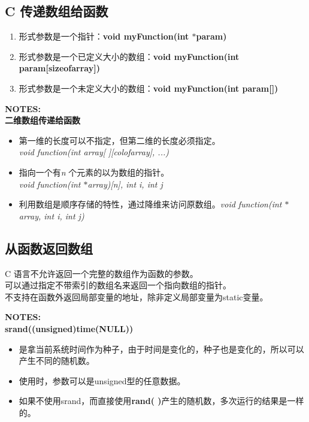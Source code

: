 \documentclass[UTF8]{ctexart}
\begin{document}
	\subsection{C 传递数组给函数}
		\begin{enumerate}
			\item 形式参数是一个指针：\textbf{void myFunction(int $*$param)}
			\item 形式参数是一个已定义大小的数组：\textbf{void myFunction(int param[sizeofarray])}
			\item 形式参数是一个未定义大小的数组：\textbf{void myFunction(int param[])}
		\end{enumerate}
		\begin{framed}
			\textbf{NOTES:}\\
			\textbf{二维数组传递给函数}
			\begin{itemize}
				\item 第一维的长度可以不指定，但第二维的长度必须指定。\\ \emph{void function(int array[ ][colofarray], ...)}
				\item 指向一个有\emph{n} 个元素的以为数组的指针。\\ \emph{void function(int $*$array)[n], int i, int j}
				\item 利用数组是顺序存储的特性，通过降维来访问原数组。\emph{void function(int $*$array, int i, int j)}
			\end{itemize}
		\end{framed}
		\subsection{从函数返回数组}
		C 语言不允许返回一个完整的数组作为函数的参数。\\
		可以通过指定不带索引的数组名来返回一个指向数组的指针。\\
		不支持在函数外返回局部变量的地址，除非定义局部变量为static变量。
		\begin{framed}
			\textbf{NOTES:}\\
			\textbf{srand((unsigned)time(NULL))}
			\begin{itemize}
				\item 是拿当前系统时间作为种子，由于时间是变化的，种子也是变化的，所以可以产生不同的随机数。
				\item 使用时，参数可以是unsigned型的任意数据。
				\item 如果不使用srand，而直接使用\textbf{rand( )}产生的随机数，多次运行的结果是一样的。
			\end{itemize}
		\end{framed}
\end{document}
